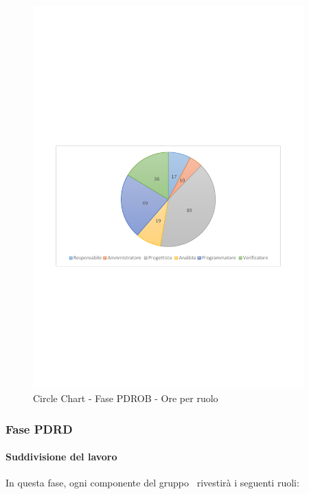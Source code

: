 \documentclass[../PianoProgetto.tex]{subfiles}
\begin{document}
	\begin{figure}[!h]
		\centering
		\includegraphics[width=0.93\textwidth , trim=2cm 9.5cm 2cm 11cm]{grafici/PDROB/PDROB-ore-ruolo}
			\caption{Circle Chart - Fase PDROB - Ore per ruolo}
		\label{fig:CircleChart-fasePDROB_ore_r}
	\end{figure}
\vfill	
\newpage	
	
	\subsubsection{Fase PDRD}
				\paragraph{Suddivisione del lavoro}
					In questa fase, ogni componente del gruppo \leaf\ rivestirà i seguenti ruoli:
	
\end{document}
